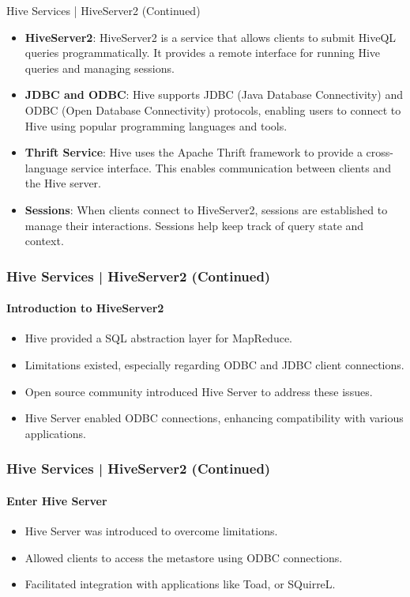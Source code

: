 \begin{frame}{Hive Services | HiveServer2 (Continued)}
	\begin{itemize}
		\item \textbf{HiveServer2}: HiveServer2 is a service that allows clients to submit HiveQL queries programmatically. It provides a remote interface for running Hive queries and managing sessions.
		\item \textbf{JDBC and ODBC}: Hive supports JDBC (Java Database Connectivity) and ODBC (Open Database Connectivity) protocols, enabling users to connect to Hive using popular programming languages and tools.
		\item \textbf{Thrift Service}: Hive uses the Apache Thrift framework to provide a cross-language service interface. This enables communication between clients and the Hive server.
		\item \textbf{Sessions}: When clients connect to HiveServer2, sessions are established to manage their interactions. Sessions help keep track of query state and context.
	\end{itemize}
\end{frame}
\begin{frame}
	\frametitle{Hive Services | HiveServer2 (Continued)}
	\framesubtitle{Introduction to HiveServer2}
	
	\begin{itemize}
	  \item Hive provided a SQL abstraction layer for MapReduce.
	  \item Limitations existed, especially regarding ODBC and JDBC client connections.
	  \item Open source community introduced Hive Server to address these issues.
	  \item Hive Server enabled ODBC connections, enhancing compatibility with various applications.
	\end{itemize}
	
	\end{frame}
	
	\begin{frame}
	\frametitle{Hive Services | HiveServer2 (Continued)}
	\framesubtitle{Enter Hive Server}
	
	\begin{itemize}
	  \item Hive Server was introduced to overcome limitations.
	  \item Allowed clients to access the metastore using ODBC connections.
	  \item Facilitated integration with applications like Toad, or SQuirreL.
	\end{itemize}
	
	\end{frame}
	
